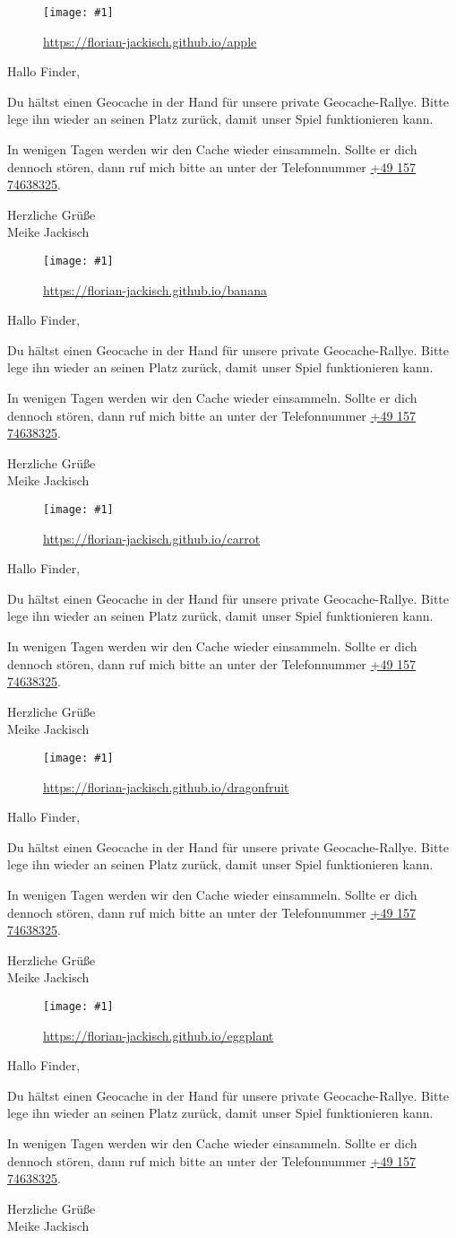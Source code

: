 \documentclass[a4paper,oneside]{article}
\newcommand{\myQRCodes}[2]{
        \begin{minipage}[t][7cm][b]{7cm}
        \begin{figure}[H]
            \centering
            \texttt{[image: \#1]}
            \caption*{\url{#2}}
        \end{figure}
        \end{minipage}
}
\newcommand{\explanation}{
        \setlength{\skip0}{\parskip}
        \begin{minipage}[t][7cm][c]{7cm}
        \setlength\parskip{\skip0}
Hallo Finder,

Du hältst einen Geocache in der Hand für unsere private Geocache-Rallye.
Bitte lege ihn wieder an seinen Platz zurück, damit unser Spiel funktionieren kann.

In wenigen Tagen werden wir den Cache wieder einsammeln.
Sollte er dich dennoch stören, dann ruf mich bitte an unter der Telefonnummer \href{tel:+49 157 74638325}{+49 157 74638325}.

Herzliche Grüße\\
Meike Jackisch
        \end{minipage}
}
\begin{document}

\myQRCodes{apple.png}{https://florian-jackisch.github.io/apple}
\explanation

\myQRCodes{banana.png}{https://florian-jackisch.github.io/banana}
\explanation

\myQRCodes{carrot.png}{https://florian-jackisch.github.io/carrot}
\explanation

\myQRCodes{dragonfruit.png}{https://florian-jackisch.github.io/dragonfruit}
\explanation

\myQRCodes{eggplant.png}{https://florian-jackisch.github.io/eggplant}
\explanation
\end{document}
